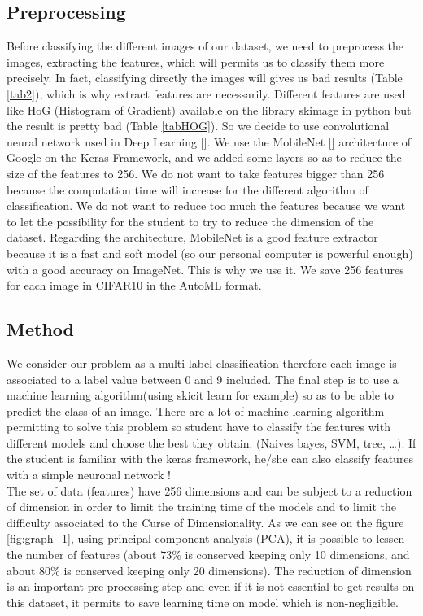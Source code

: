 \documentclass[10pt, a4paper, twocolumn]{article} %
\begin{document}
\subsection{Preprocessing}
Before classifying the different images of our dataset, we need to preprocess the images, extracting the features, which will permits us to classify them more precisely. In fact, classifying directly the images will gives us bad results (Table \ref{tab2}), which is why extract features are necessarily.  Different features are used like HoG (Histogram of Gradient) available on the library skimage in python but the result is pretty bad (Table \ref{tabHOG}). So we decide to use convolutional neural network used in Deep Learning [\cite{2}].  We use the MobileNet [\cite{3}] architecture of Google on the Keras Framework, and we added some layers so as to reduce the size of the features to 256. We do not want to take features bigger than 256 because the computation time will increase for the different algorithm of classification. We do not want to reduce too much the features because we want to let the possibility for the student to try to reduce the dimension of the dataset.  Regarding the architecture, MobileNet is a good feature extractor because it is a fast and soft model (so our personal computer is powerful enough) with a good accuracy on ImageNet. This is why we use it. We save 256 features for each image in CIFAR10 in the AutoML format. 

\subsection{Method}
We consider our problem as a multi label classification therefore each image is associated to a label value between 0 and 9 included. The final step is to use a machine learning algorithm(using skicit learn for example) so as to be able to predict the class of an image. There are a lot of machine learning algorithm permitting to solve this problem so student have to classify the features with different models and choose the best they obtain. (Naives bayes, SVM, tree, …).
If the student is familiar with the keras framework, he/she can also classify features with a simple neuronal network ! \\The set of data (features) have 256 dimensions and can be subject to a reduction of dimension in order to limit the training time of the models and to limit the difficulty associated to the Curse of Dimensionality. As we can see on the figure \ref{fig:graph_1}, using  principal component analysis (PCA), it is possible to lessen the number of features (about $73\%$ is conserved keeping only 10 dimensions, and about $80\%$ is conserved keeping only 20 dimensions). The reduction of dimension is an important pre-processing step and even if it is not essential to get
results on this dataset, it permits to save learning time on model which is non-negligible.\\
\end{document}
